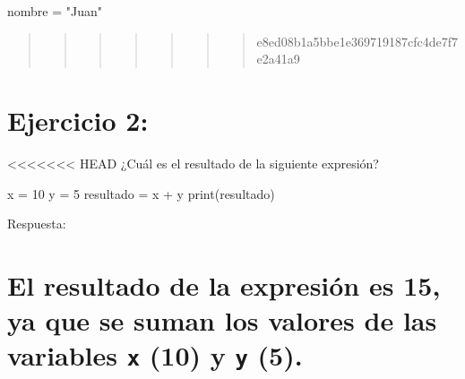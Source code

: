 \documentclass[
  a4paper,
  onepage,
  openany]{scrreprt}
\newenvironment{Shaded}{\begin{snugshade}}{\end{snugshade}}
\newcommand{\BuiltInTok}[1]{\textcolor[rgb]{0.00,0.23,0.31}{#1}}
\newcommand{\DecValTok}[1]{\textcolor[rgb]{0.68,0.00,0.00}{#1}}
\newcommand{\NormalTok}[1]{\textcolor[rgb]{0.00,0.23,0.31}{#1}}
\newcommand{\OperatorTok}[1]{\textcolor[rgb]{0.37,0.37,0.37}{#1}}
\newcommand{\StringTok}[1]{\textcolor[rgb]{0.13,0.47,0.30}{#1}}
\begin{document}
\begin{Shaded}
\begin{Highlighting}[]
\NormalTok{nombre }\OperatorTok{=} \StringTok{"Juan"}
\end{Highlighting}
\end{Shaded}

\begin{quote}
\begin{quote}
\begin{quote}
\begin{quote}
\begin{quote}
\begin{quote}
\begin{quote}
e8ed08b1a5bbe1e369719187cfc4de7f7e2a41a9
\end{quote}
\end{quote}
\end{quote}
\end{quote}
\end{quote}
\end{quote}
\end{quote}

\hypertarget{ejercicio-2}{%
\chapter{Ejercicio 2:}\label{ejercicio-2}}

\textless\textless\textless\textless\textless\textless\textless{} HEAD
¿Cuál es el resultado de la siguiente expresión?

\begin{Shaded}
\begin{Highlighting}[]
\NormalTok{x }\OperatorTok{=} \DecValTok{10}
\NormalTok{y }\OperatorTok{=} \DecValTok{5}
\NormalTok{resultado }\OperatorTok{=}\NormalTok{ x }\OperatorTok{+}\NormalTok{ y}
\BuiltInTok{print}\NormalTok{(resultado)}
\end{Highlighting}
\end{Shaded}

Respuesta:

\hypertarget{el-resultado-de-la-expresiuxf3n-es-15-ya-que-se-suman-los-valores-de-las-variables-x-10-y-y-5.}{%
\chapter{\texorpdfstring{El resultado de la expresión es 15, ya que se
suman los valores de las variables \texttt{x} (10) y \texttt{y}
(5).}{El resultado de la expresión es 15, ya que se suman los valores de las variables x (10) y y (5).}}\label{el-resultado-de-la-expresiuxf3n-es-15-ya-que-se-suman-los-valores-de-las-variables-x-10-y-y-5.}}
\end{document}
